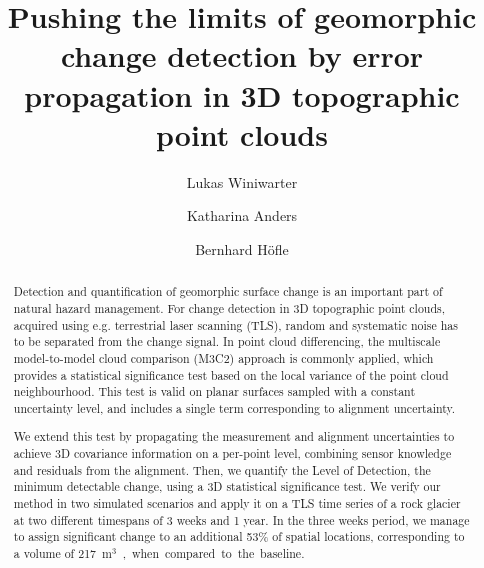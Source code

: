 \documentclass[preprint,12pt,3p]{elsarticle}
\begin{document}
\begin{frontmatter}


\title{Pushing the limits of geomorphic change detection by error propagation in 3D topographic point clouds}




\author[1]{Lukas Winiwarter}
\author[1,2]{Katharina Anders}
\author[1,2]{Bernhard Höfle}
\address[1]{3DGeo Research Group, Institute of Geography, Heidelberg University, Germany}
\address[2]{Institute for Scientific Computing (IWR), Heidelberg University, Germany}

\begin{abstract}
Detection and quantification of geomorphic surface change is an important part of natural hazard management. For change detection in 3D topographic point clouds, acquired using e.g. terrestrial laser scanning (TLS), random and systematic noise has to be separated from the change signal. In point cloud differencing, the multiscale model-to-model cloud comparison (M3C2) approach is commonly applied, which provides a statistical significance test based on the local variance of the point cloud neighbourhood. This test is valid on planar surfaces sampled with a constant uncertainty level, and includes a single term corresponding to alignment uncertainty. 

We extend this test by propagating the measurement and alignment uncertainties to achieve 3D covariance information on a per-point level, combining sensor knowledge and residuals from the alignment. Then, we quantify the Level of Detection, the minimum detectable change, using a 3D statistical significance test. 
We verify our method in two simulated scenarios and apply it on a TLS time series of a rock glacier at two different timespans of 3 weeks and 1 year. 
In the three weeks period, we manage to assign significant change to an additional 53\% of
spatial locations, corresponding to a volume of \SI{217}{m$^3$}, when compared to the baseline. 
\end{abstract}


\end{frontmatter}
\end{document}
